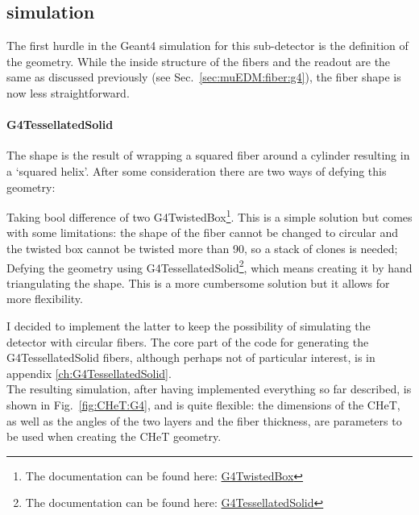 \begin{refsection}
    \subsection{\gf simulation}
        The first hurdle in the Geant4 simulation for this sub-detector is the definition of the geometry.
        While the inside structure of the fibers and the readout are the same as discussed previously (see Sec.~\ref{sec:muEDM:fiber:g4}), the fiber shape is now less straightforward.
        
        \paragraph{G4TessellatedSolid}
        The shape is the result of wrapping a squared fiber around a cylinder resulting in a `squared helix'.
        After some consideration there are two ways of defying this geometry:
        \begin{outline}
            \1 Taking bool difference of two G4TwistedBox\footnote{The documentation can be found here: \href{https://apc.u-paris.fr/~franco/g4doxy/html/classG4TwistedBox.html}{G4TwistedBox}}. 
            This is a simple solution but comes with some limitations: the shape of the fiber cannot be changed to circular and the twisted box cannot be twisted more than \SI{90}{\deg}, so a stack of clones is needed; 
            \1 Defying the geometry using G4TessellatedSolid\footnote{The documentation can be found here: \href{https://apc.u-paris.fr/~franco/g4doxy/html/classG4TessellatedSolid.html}{G4TessellatedSolid}}, which means creating it by hand triangulating the shape. This is a more cumbersome solution but it allows for more flexibility.
        \end{outline}
        I decided to implement the latter to keep the possibility of simulating the detector with circular fibers.
        The core part of the code for generating the G4TessellatedSolid fibers, although perhaps not of particular interest, is in appendix \ref{ch:G4TessellatedSolid}.\\

        \noindent
        The resulting simulation, after having implemented everything so far described, is shown in Fig.~\ref{fig:CHeT:G4}, and is quite flexible: the dimensions of the CHeT, as well as the angles of the two layers and the fiber thickness, are parameters to be used when creating the CHeT geometry.


\end{refsection}
